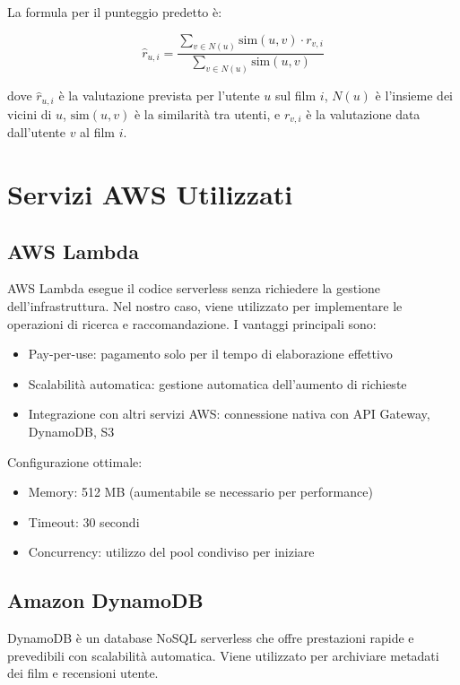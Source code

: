 \documentclass[11pt,a4paper]{article}
\begin{document}
La formula per il punteggio predetto è:

\begin{equation}
\hat{r}_{u,i} = \frac{\sum_{v \in N(u)} \text{sim}(u,v) \cdot r_{v,i}}{\sum_{v \in N(u)} \text{sim}(u,v)}
\end{equation}

dove $\hat{r}_{u,i}$ è la valutazione prevista per l'utente $u$ sul film $i$, $N(u)$ è l'insieme dei vicini di $u$, $\text{sim}(u,v)$ è la similarità tra utenti, e $r_{v,i}$ è la valutazione data dall'utente $v$ al film $i$.

\section{Servizi AWS Utilizzati}
\subsection{AWS Lambda}
AWS Lambda esegue il codice serverless senza richiedere la gestione dell'infrastruttura. Nel nostro caso, viene utilizzato per implementare le operazioni di ricerca e raccomandazione. I vantaggi principali sono:

\begin{itemize}
  \item Pay-per-use: pagamento solo per il tempo di elaborazione effettivo
  \item Scalabilità automatica: gestione automatica dell'aumento di richieste
  \item Integrazione con altri servizi AWS: connessione nativa con API Gateway, DynamoDB, S3
\end{itemize}

Configurazione ottimale:
\begin{itemize}
  \item Memory: 512 MB (aumentabile se necessario per performance)
  \item Timeout: 30 secondi
  \item Concurrency: utilizzo del pool condiviso per iniziare
\end{itemize}

\subsection{Amazon DynamoDB}
DynamoDB è un database NoSQL serverless che offre prestazioni rapide e prevedibili con scalabilità automatica. Viene utilizzato per archiviare metadati dei film e recensioni utente.
\end{document}
